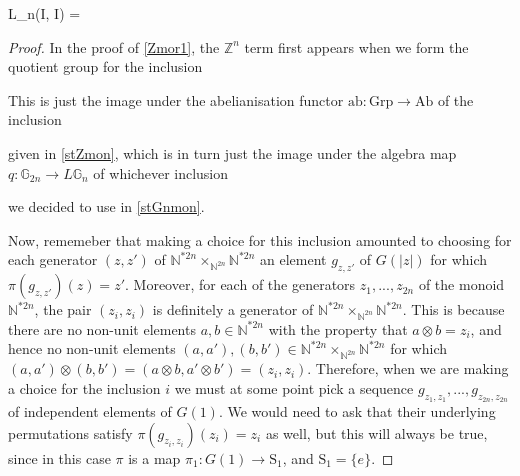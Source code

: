 \begin{prop} \label{identityquot}

\begin{eq*} L_n(I, I) \quad = \quad {} \end{eq*}

\end{prop}
\begin{proof}
In the proof of \cref{Zmor1}, the $\mathbb{Z}^n$ term first appears when we form the quotient group for the inclusion
\begin{eq*}  \end{eq*}
This is just the image under the abelianisation functor $\mathrm{ab}: \mathrm{Grp} \to \mathrm{Ab}$ of the inclusion
\begin{eq*}  \end{eq*}
given in \cref{stZmon}, which is in turn just the image under the algebra map $q: \mathbb{G}_{2n} \to L\mathbb{G}_n$ of whichever inclusion
\begin{eq*}  \end{eq*}
we decided to use in \cref{stGnmon}.

Now, rememeber that making a choice for this inclusion amounted to choosing for each generator $(z, z')$ of $\mathbb{N}^{\ast 2n} \times_{\mathbb{N}^{2n}} \mathbb{N}^{\ast 2n}$ an element $g_{z, z'}$ of $G(|z|)$ for which $\pi(g_{z, z'})(z) = z'$. Moreover, for each of the generators $z_1, ..., z_{2n}$ of the monoid $\mathbb{N}^{\ast 2n}$, the pair $(z_i, z_i)$ is definitely a generator of $\mathbb{N}^{\ast 2n} \times_{\mathbb{N}^{2n}} \mathbb{N}^{\ast 2n}$. This is because there are no non-unit elements $a, b \in \mathbb{N}^{\ast 2n}$ with the property that $a \otimes b = z_i$, and hence no non-unit elements $(a, a'), (b, b') \in \mathbb{N}^{\ast 2n} \times_{\mathbb{N}^{2n}} \mathbb{N}^{\ast 2n}$ for which $(a, a') \otimes (b, b') = (a \otimes b, a' \otimes b') = (z_i, z_i)$. Therefore, when we are making a choice for the inclusion $i$ we must at some point pick a sequence $g_{z_1, z_1}, ..., g_{z_{2n}, z_{2n}}$ of independent elements of $G(1)$. We would need to ask that their underlying permutations satisfy $\pi(g_{z_i, z_i})(z_i) = z_i$ as well, but this will always be true, since in this case $\pi$ is a map $\pi_1 : G(1) \to \mathrm{S}_1$, and $\mathrm{S}_1 = \{e\}$.


\end{proof}
